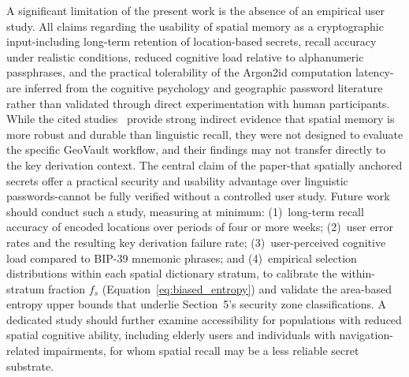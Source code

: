 \documentclass[journal,article,submit,pdftex,moreauthors]{Definitions/mdpi}
\newcommand{\add}[1]{#1}
\newcommand{\add}[1]{\added{#1}}
\begin{document}
\add{A significant limitation of the present work is the absence of an empirical user study. All claims regarding the usability of spatial memory as a cryptographic input-including long-term retention of location-based secrets, recall accuracy under realistic conditions, reduced cognitive load relative to alphanumeric passphrases, and the practical tolerability of the Argon2id computation latency-are inferred from the cognitive psychology and geographic password literature rather than validated through direct experimentation with human participants. While the cited studies~\cite{montello1998new, McNamara2003, Konkle2010, Lukavsky2017, Thorpe2013, MacRae2016} provide strong indirect evidence that spatial memory is more robust and durable than linguistic recall, they were not designed to evaluate the specific GeoVault workflow, and their findings may not transfer directly to the key derivation context. The central claim of the paper-that spatially anchored secrets offer a practical security and usability advantage over linguistic passwords-cannot be fully verified without a controlled user study. Future work should conduct such a study, measuring at minimum: (1)~long-term recall accuracy of encoded locations over periods of four or more weeks; (2)~user error rates and the resulting key derivation failure rate; (3)~user-perceived cognitive load compared to BIP-39 mnemonic phrases; and (4)~empirical selection distributions within each spatial dictionary stratum, to calibrate the within-stratum fraction $f_s$ (Equation~\ref{eq:biased_entropy}) and validate the area-based entropy upper bounds that underlie Section~5's security zone classifications. \add{A dedicated study should further examine accessibility for populations with reduced spatial cognitive ability, including elderly users and individuals with navigation-related impairments, for whom spatial recall may be a less reliable secret substrate.}}
\end{document}
